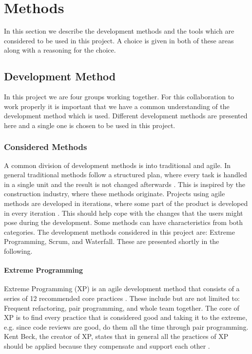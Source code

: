 \section{Methods}
In this section we describe the development methods and the tools which are considered to be used in this project.
A choice is given in both of these areas along with a reasoning for the choice.

\subsection{Development Method}
In this project we are four groups working together.
For this collaboration to work properly it is important that we have a common understanding of the development method which is used.
Different development methods are presented here and a single one is chosen to be used in this project.

\subsubsection{Considered Methods}
A common division of development methods is into traditional and agile.
In general traditional methods follow a structured plan, where every task is handled in a single unit and the result is not changed afterwards \cite[sec.~2.7]{Poppendieck00}.
This is inspired by the construction industry, where these methods originate.
Projects using agile methods are developed in iterations, where some part of the product is developed in every iteration \cite[p.~25]{Larman04}.
This should help cope with the changes that the users might pose during the development.
Some methods can have characteristics from both categories.
The development methods considered in this project are: Extreme Programming, Scrum, and Waterfall.
These are presented shortly in the following.

\paragraph{Extreme Programming}
Extreme Programming (XP) is an agile development method that consists of a series of 12 recommended core practices \cite[p.~137]{Larman04}.
These include but are not limited to: Frequent refactoring, pair programming, and  whole team together.
The core of XP is to find every practice that is considered good and taking it to the extreme, e.g. since code reviews are good, do them all the time through pair programming.
Kent Beck, the creator of XP, states that in general all the practices of XP should be applied because they compensate and support each other \cite[p.~156-157]{Larman04}.

